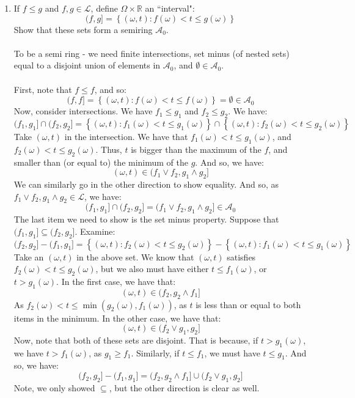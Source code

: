 \documentclass[12pt,a4paper]{article}
\newcommand{\1}[1]{\mathbbm{1}\left\{ #1 \right\}}
\newcommand{\R}{\mathbb{R}}
\newcommand{\acal}{\mathcal{A}}
\newcommand{\lcal}{\mathcal{L}}
\begin{document}
\begin{enumerate}
	\item If $f \leq g$ and $f,g \in \lcal$, define $\Omega \times \R$ an ``interval":
	$$
		(f,g] = \left\{(\omega,t): f(\omega) < t \leq g(\omega)\right\}
	$$
	Show that these sets form a semiring $\acal_0$.
	\\\\
	To be a semi ring - we need finite intersections, set minus (of nested sets) equal to a disjoint union of elements in $\acal_0$, and $\emptyset \in \acal_0$.
	\\\\
	First, note that $f \leq f$, and so:
	$$
		(f,f] = \left\{(\omega,t): f(\omega) < t \leq f(\omega)\right\} = \emptyset \in \acal_0
	$$
	Now, consider intersections. We have $f_1 \leq g_1$ and $f_2 \leq g_2$. We have:
	$$
		(f_1,g_1] \cap (f_2,g_2] =
		\left\{(\omega,t): f_1(\omega) < t \leq g_1(\omega)\right\} \cap
		\left\{(\omega,t): f_2(\omega) < t \leq g_2(\omega)\right\}
	$$
	Take $(\omega,t)$ in the intersection. We have that $f_1(\omega) < t \leq g_1(\omega)$, and $f_2(\omega) < t \leq g_2(\omega)$. Thus, $t$ is bigger than the maximum of the $f$, and smaller than (or equal to) the minimum of the $g$. And so, we have:
	$$
		(\omega,t) \in (f_1 \vee f_2, g_1 \wedge g_2]
	$$
	We can similarly go in the other direction to show equality. And so, as $f_1 \vee f_2, g_1 \wedge g_2 \in \lcal$, we have:
	$$
		(f_1,g_1] \cap (f_2,g_2] = (f_1 \vee f_2, g_1 \wedge g_2] \in \acal_0
	$$
	The last item we need to show is the set minus property. Suppose that $(f_1,g_1] \subseteq (f_2,g_2]$. Examine:
	$$
		(f_2,g_2] - (f_1,g_1] =
		\left\{(\omega,t): f_2(\omega) < t \leq g_2(\omega)\right\} - \left\{(\omega,t): f_1(\omega) < t \leq g_1(\omega)\right\}
	$$
	Take an $(\omega,t)$ in the above set. We know that $(\omega,t)$ satisfies $f_2(\omega) < t \leq g_2(\omega)$, but we also must have either $t \leq f_1(\omega)$, or $t > g_1(\omega)$. In the first case, we have that:
	$$
		(\omega,t) \in (f_2, g_2 \wedge f_1]
	$$
	As $f_2(\omega) < t \leq \min(g_2(\omega), f_1(\omega))$, as $t$ is less than or equal to both items in the minimum. In the other case, we have that:
	$$
		(\omega,t) \in (f_2 \vee g_1, g_2]
	$$
	Now, note that both of these sets are disjoint. That is because, if $t > g_1(\omega)$, we have $t > f_1(\omega)$, as $g_1 \geq f_1$. Similarly, if $t \leq f_1$, we must have $t \leq g_1$. And so, we have:
	$$
		(f_2,g_2] - (f_1,g_1] = (f_2, g_2 \wedge f_1] \cup (f_2 \vee g_1, g_2]
	$$
	Note, we only showed $\subseteq$, but the other direction is clear as well.
	

\end{enumerate}
\end{document}
